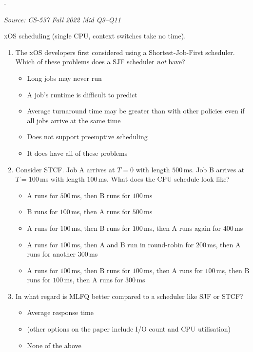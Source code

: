\documentclass[11pt,a4paper]{article}
\makeatletter
\newcommand{\keepspace}[1]{\par\penalty-100\begingroup
  \setlength{\dimen@}{#1}\dimen@ii\pagegoal\advance\dimen@ii-\pagetotal
  \ifdim\dimen@>\dimen@ii\ifdim\dimen@ii>\z@\vfil\fi\break\fi\endgroup}
\newcounter{qn}[section]
\newenvironment{Qn}[4]{%
  \refstepcounter{qn}\keepspace{7\baselineskip}%
  \begin{tcolorbox}[qboxstyle, title={Q\thesection.\theqn\ \ [#1 \textbar\ #2]\ \ #4}]%
  {\footnotesize\color{g3}\textit{Source: #3}}\par\smallskip%
}{%
  \end{tcolorbox}%
}
\makeatother
\begin{document}
\begin{Qn}{Medium-Hard}{Lect 5--6}{CS-537 Fall 2022 Mid Q9--Q11}{SJF problems, STCF preemption, MLFQ vs.\ SJF/STCF}
xOS scheduling (single CPU, context switches take no time).
\begin{enumerate}
  \item[9.] The xOS developers first considered using a Shortest-Job-First scheduler. Which of these problems does a SJF scheduler \emph{not} have?
  \begin{itemize}
    \item[(a)] Long jobs may never run
    \item[(b)] A job's runtime is difficult to predict
    \item[(c)] Average turnaround time may be greater than with other policies even if all jobs arrive at the same time
    \item[(d)] Does not support preemptive scheduling
    \item[(e)] It does have all of these problems
  \end{itemize}
  \item[10.] Consider STCF. Job A arrives at $T=0$ with length $500$\,ms. Job B arrives at $T=100$\,ms with length $100$\,ms. What does the CPU schedule look like?
  \begin{itemize}
    \item[(a)] A runs for $500$\,ms, then B runs for $100$\,ms
    \item[(b)] B runs for $100$\,ms, then A runs for $500$\,ms
    \item[(c)] A runs for $100$\,ms, then B runs for $100$\,ms, then A runs again for $400$\,ms
    \item[(d)] A runs for $100$\,ms, then A and B run in round-robin for $200$\,ms, then A runs for another $300$\,ms
    \item[(e)] A runs for $100$\,ms, then B runs for $100$\,ms, then A runs for $100$\,ms, then B runs for $100$\,ms, then A runs for $300$\,ms
  \end{itemize}
  \item[11.] In what regard is MLFQ better compared to a scheduler like SJF or STCF?
  \begin{itemize}
    \item[(a)] Average response time
    \item[(b)] (other options on the paper include I/O count and CPU utilisation)
    \item[(e)] None of the above
  \end{itemize}
\end{enumerate}
\end{Qn}
\end{document}
